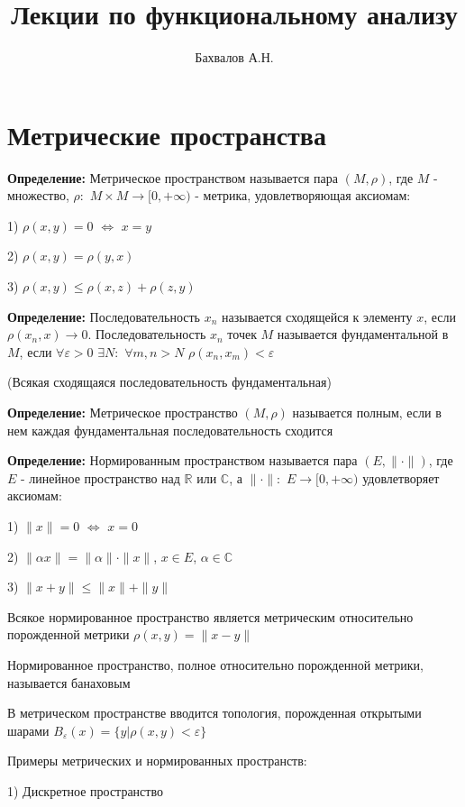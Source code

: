 \documentclass[a4paper]{report}
\author{Бахвалов А.Н.}
\title{Лекции по функциональному анализу}
\begin{document}
\maketitle
\chapter{Метрические пространства}

\noindent\textbf{Определение:} Метрическое пространством называется пара $(M,\rho)$, где $M$ - множество, $\rho:$ 
$M\times M\to[0,+\infty)$ - метрика, удовлетворяющая аксиомам:

1) $\rho(x,y)=0$ $\Leftrightarrow$ $x=y$

2) $\rho(x,y)=\rho(y,x)$

3) $\rho(x,y)\le\rho(x,z)+\rho(z,y)$
\bigskip

\noindent\textbf{Определение:} Последовательность ${x_n}$ называется сходящейся к элементу $x$, если $\rho(x_n,x)\to0$.
Последовательность ${x_n}$ точек $M$ называется фундаментальной в $M$, если $\forall\varepsilon>0$ $\exists N:$ $\forall
m,n>N$ $\rho(x_n,x_m)<\varepsilon$

(Всякая сходящаяся последовательность фундаментальная)
\bigskip

\noindent\textbf{Определение:} Метрическое пространство $(M,\rho)$  называется полным, если в нем каждая фундаментальная
последовательность сходится
\bigskip

\noindent\textbf{Определение:} Нормированным пространством называется пара $(E,\|\cdot\|)$, где $E$ - 
линейное пространство над $\mathbb R$ или $\mathbb C$, а $\|\cdot\|:$ $E\to[0,+\infty)$ удовлетворяет аксиомам:

1) $\|x\|=0$ $\Leftrightarrow$ $x=0$

2) $\|\alpha x\|=\|\alpha\|\cdot\| x\|$, $x\in E$, $\alpha\in\mathbb C$

3) $\|x+y\|\le\|x\|+\|y\|$
\bigskip

Всякое нормированное пространство является метрическим относительно порожденной метрики $\rho(x,y)=\|x-y\|$

Нормированное пространство, полное относительно порожденной метрики, называется банаховым

В метрическом пространстве вводится топология, порожденная открытыми шарами $B_\varepsilon(x)=\{y|\rho(x,y)<\varepsilon\}$
\bigskip

\noindent Примеры метрических и нормированных пространств:

1) Дискретное пространство
\end{document}
